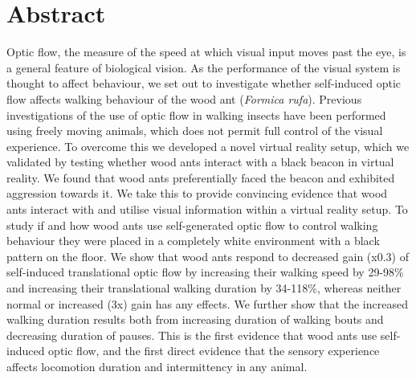 \chapter*{Abstract}
\label{chap:abstract}
Optic flow, the measure of the speed at which visual input moves past the eye, is a general feature of biological vision. As the performance of the visual system is thought to affect behaviour, we set out to investigate whether self-induced optic flow affects walking behaviour of the wood ant (\textit{Formica rufa}). Previous investigations of the use of optic flow in walking insects have been performed using freely moving animals, which does not permit full control of the visual experience. To overcome this we developed a novel virtual reality setup, which we validated by testing whether wood ants interact with a black beacon in virtual reality. We found that wood ants preferentially faced the beacon and exhibited aggression towards it. We take this to provide convincing evidence that wood ants interact with and utilise visual information within a virtual reality setup. To study if and how wood ants use self-generated optic flow to control walking behaviour they were placed in a completely white environment with a black pattern on the floor. We show that wood ants respond to decreased gain (x0.3) of self-induced translational optic flow by increasing their walking speed by 29-98\% and increasing their translational walking duration by 34-118\%, whereas neither normal or increased (3x) gain has any effects. We further show that the increased walking duration results both from increasing duration of walking bouts and decreasing duration of pauses. This is the first evidence that wood ants use self-induced optic flow, and the first direct evidence that the sensory experience affects locomotion duration and intermittency in any animal.